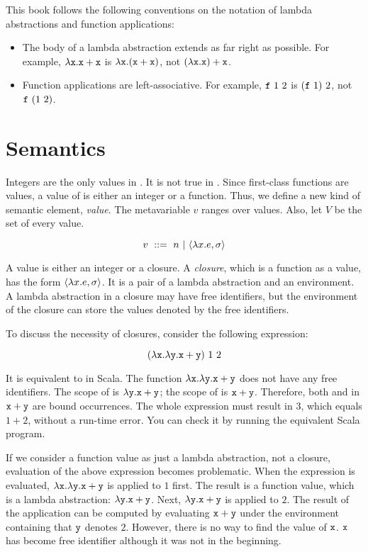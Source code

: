 This book follows the following conventions on the notation of lambda
abstractions and function applications:

\begin{itemize}
  \item The body of a lambda abstraction extends as far right as possible. For
    example, $\lambda\texttt{x}.\texttt{x}+\texttt{x}$ is $\lambda\texttt{x}.(\texttt{x}+\texttt{x})$,
    not $(\lambda\texttt{x}.\texttt{x})+\texttt{x}$.
  \item Function applications are left-associative. For example,
    $\texttt{f}\ 1\ 2$ is $(\texttt{f}\ 1)\ 2$, not
    $\texttt{f}\ (1\ 2)$.
\end{itemize}

\section{Semantics}

Integers are the only values in \plang. It is not true in \lang. Since
first-class functions are values, a value of \lang is either an integer or a
function. Thus, we define a new kind of semantic element,
\textit{value}. The
metavariable $v$ ranges over values. Also, let $V$ be the set of every value.

\[ v\ ::=\ n\ |\ \clov{x}{e}{\sigma} \]

A value is either an integer or a closure. A \textit{closure}, which is a
function as a value, has the form $\langle\lambda x.e,\sigma\rangle$.
It is a pair of a lambda abstraction and an environment.
A lambda abstraction in a closure may have free identifiers,
but the environment of the closure can store the values denoted by the
free identifiers.

To discuss the necessity of closures, consider the following expression:

\[(\lambda\texttt{x}.\lambda\texttt{y}.\texttt{x}+\texttt{y})\ 1\ 2\]

It is equivalent to  in Scala.
The function $\lambda\texttt{x}.\lambda\texttt{y}.\texttt{x}+\texttt{y}$ does not have any free
identifiers. The scope of  is ${\lambda\texttt{y}.\texttt{x}+\texttt{y}}$; the scope
of  is ${\texttt{x}+\texttt{y}}$. Therefore, both  and  in
$\texttt{x}+\texttt{y}$ are bound occurrences. The whole expression must result in $3$,
which equals $1+2$, without a run-time error. You can check it by running the
equivalent Scala program.

If we consider a function value as just a lambda abstraction, not a closure,
evaluation of the above expression becomes problematic.
When the expression is evaluated, $\lambda\texttt{x}.\lambda\texttt{y}.\texttt{x}+\texttt{y}$ is
applied to $1$ first. The result is a function value, which is a lambda
abstraction: $\lambda\texttt{y}.\texttt{x}+\texttt{y}$. Next, $\lambda\texttt{y}.\texttt{x}+\texttt{y}$
is applied to $2$. The result of the application can be computed by evaluating
$\texttt{x}+\texttt{y}$ under the environment containing that $\texttt{y}$ denotes $2$.
However, there is no way to find the value of $\texttt{x}$. $\texttt{x}$ has become free
identifier although it was not in the beginning.

